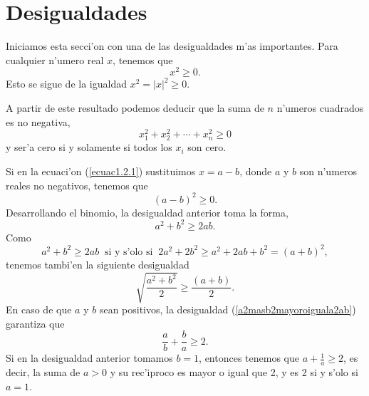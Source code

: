 
\section{Desigualdades}
\label{sec-desigualdades}
\noindent Iniciamos esta secci'on con una de las  desigualdades m'as importantes.
Para cualquier n'umero real $x$, tenemos que
\begin{equation}
\label{ecuac1.2.1}
                  x^2  \geq  0.
\end{equation}
Esto se sigue de la igualdad  $x^2=|x|^2 \geq 0$.

\noindent A partir de este resultado podemos deducir  que la suma de $n$  
n'umeros cuadrados es no negativa,
\begin{equation}
\label{ecuac1.2.2}
                      x_1^2+x_2^2+\cdots+ x_n^2  \geq  0
\end{equation}
y ser'a cero  si y solamente si todos los $x_i$ son cero.

\noindent Si en la ecuaci'on (\ref{ecuac1.2.1}) sustituimos $x=a-b$, donde
$a$ y $b$ son n'umeros reales no negativos, tenemos que
$$
     (a-b)^2\geq 0.
$$
Desarrollando el binomio, la desigualdad anterior toma la forma,
\begin{equation}
        a^2+b^2 \geq 2ab.
\label{a2masb2mayoroiguala2ab}
\end{equation}
Como 
$$
   a^2+b^2\geq 2ab \;\;\text{si y s'olo si}\;\; 2a^2+2b^2\geq a^2+2ab+b^2=
	 (a+b)^2,
$$ 
tenemos tambi'en la siguiente desigualdad 
\begin{equation}
\label{ecuac1.2.3}\sqrt{ \frac{a^2+b^2}{2}}  \geq  \frac{(a+b)}{2}.
\end{equation}				
En caso de que $a$ y $b$ sean positivos, la  desigualdad (\ref{a2masb2mayoroiguala2ab}) garantiza que 
\begin{equation}
\label{numeroyreciproco}
        \frac{a}{b}+\frac{b}{a}\geq 2.
\end{equation}
Si en la desigualdad anterior tomamos $b=1$, entonces tenemos que  
$a+\frac{1}{a}\geq 2$, es decir, la suma de $a>0$ y su rec'iproco es 
mayor o igual que 2, y es 2 si y s'olo si  $a=1$.

\vei


